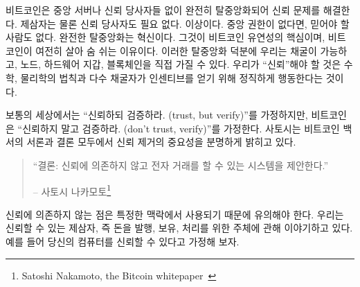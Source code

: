 \begin{comment}
Bitcoin solves the problem of trust by being completely decentralized,
with no central server or trusted parties. Not even trusted \textit{third}
parties, but trusted parties, period. When there is no central
authority, there simply \textit{is} no-one to trust. Complete decentralization
is the innovation. It is the root of Bitcoin's resilience, the reason
why it is still alive. Decentralization is also why we have mining,
nodes, hardware wallets, and yes, the blockchain. The only thing you
have to \enquote{trust} is that our understanding of mathematics and physics
isn't totally off and that the majority of miners act honestly (which
they are incentivized to do).
\end{comment}
비트코인은 중앙 서버나 신뢰 당사자들 없이 완전히 탈중앙화되어 신뢰 문제를 해결한다.
제삼자는 물론 신뢰 당사자도 필요 없다. 이상이다.
중앙 권한이 없다면, 믿어야 할 사람도 없다.
완전한 탈중앙화는 혁신이다. 
그것이 비트코인 유연성의 핵심이며, 비트코인이 여전히 살아 숨 쉬는 이유이다.
이러한 탈중앙화 덕분에 우리는 채굴이 가능하고, 노드, 하드웨어 지갑, 블록체인을 직접 가질 수 있다. 
우리가 \enquote{신뢰}해야 할 것은 수학, 물리학의 법칙과 
다수 채굴자가 인센티브를 얻기 위해 정직하게 행동한다는 것이다.

\begin{comment}
While the regular world operates under the assumption of \textit{\enquote{trust,
but verify,}} Bitcoin operates under the assumption of \textit{\enquote{don't
trust, verify.}} Satoshi made the importance of removing trust very clear in
both the introduction as well as the conclusion of the Bitcoin whitepaper.
\end{comment}
보통의 세상에서는 \enquote{신뢰하되 검증하라. (trust, but verify)}를 가정하지만,
비트코인은 \enquote{신뢰하지 말고 검증하라. (don't trust, verify)}를 가정한다.
사토시는 비트코인 백서의 서론과 결론 모두에서 신뢰 제거의 중요성을 분명하게 밝히고 있다.

\begin{quotation}\begin{samepage}
\enquote{결론: 신뢰에 의존하지 않고 전자 거래를 할 수 있는 시스템을 제안한다.}
\begin{flushright} -- 사토시 나카모토\footnote{Satoshi Nakamoto, the Bitcoin whitepaper~\cite{whitepaper}}
\end{flushright}\end{samepage}\end{quotation}

\begin{comment}
Note that \textit{without relying on trust} is used in a very specific context
here. We are talking about trusted third parties, i.e. other entities
which you trust to produce, hold, and process your money. It is assumed,
for example, that you can trust your computer.
\end{comment}
신뢰에 의존하지 않는 점은 특정한 맥락에서 사용되기 때문에 유의해야 한다.
우리는 신뢰할 수 있는 제삼자, 즉 돈을 발행, 보유, 처리를 위한 주체에 관해 이야기하고 있다.
예를 들어 당신의 컴퓨터를 신뢰할 수 있다고 가정해 보자.

